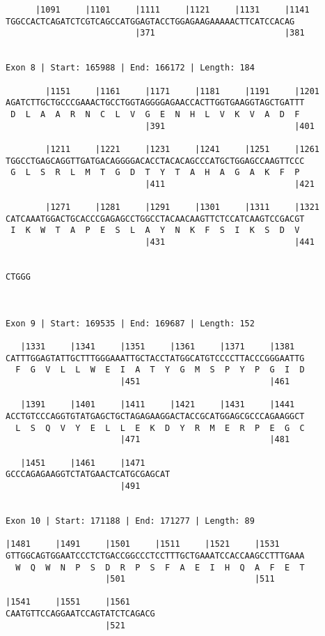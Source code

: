 \documentclass{article}
\begin{document}
\begin{Verbatim}
      |1091     |1101     |1111     |1121     |1131     |1141
TGGCCACTCAGATCTCGTCAGCCATGGAGTACCTGGAGAAGAAAAACTTCATCCACAG
                          |371                          |381
  
 
Exon 8 | Start: 165988 | End: 166172 | Length: 184
 
        |1151     |1161     |1171     |1181     |1191     |1201
AGATCTTGCTGCCCGAAACTGCCTGGTAGGGGAGAACCACTTGGTGAAGGTAGCTGATTT
 D  L  A  A  R  N  C  L  V  G  E  N  H  L  V  K  V  A  D  F 
                            |391                          |401
  
        |1211     |1221     |1231     |1241     |1251     |1261
TGGCCTGAGCAGGTTGATGACAGGGGACACCTACACAGCCCATGCTGGAGCCAAGTTCCC
 G  L  S  R  L  M  T  G  D  T  Y  T  A  H  A  G  A  K  F  P 
                            |411                          |421
  
        |1271     |1281     |1291     |1301     |1311     |1321
CATCAAATGGACTGCACCCGAGAGCCTGGCCTACAACAAGTTCTCCATCAAGTCCGACGT
 I  K  W  T  A  P  E  S  L  A  Y  N  K  F  S  I  K  S  D  V 
                            |431                          |441
  
     
CTGGG
     
  
 
Exon 9 | Start: 169535 | End: 169687 | Length: 152
 
   |1331     |1341     |1351     |1361     |1371     |1381  
CATTTGGAGTATTGCTTTGGGAAATTGCTACCTATGGCATGTCCCCTTACCCGGGAATTG
  F  G  V  L  L  W  E  I  A  T  Y  G  M  S  P  Y  P  G  I  D
                       |451                          |461   
  
   |1391     |1401     |1411     |1421     |1431     |1441  
ACCTGTCCCAGGTGTATGAGCTGCTAGAGAAGGACTACCGCATGGAGCGCCCAGAAGGCT
  L  S  Q  V  Y  E  L  L  E  K  D  Y  R  M  E  R  P  E  G  C
                       |471                          |481   
  
   |1451     |1461     |1471     
GCCCAGAGAAGGTCTATGAACTCATGCGAGCAT
                       |491      
  
 
Exon 10 | Start: 171188 | End: 171277 | Length: 89
 
|1481     |1491     |1501     |1511     |1521     |1531     
GTTGGCAGTGGAATCCCTCTGACCGGCCCTCCTTTGCTGAAATCCACCAAGCCTTTGAAA
  W  Q  W  N  P  S  D  R  P  S  F  A  E  I  H  Q  A  F  E  T
                    |501                          |511      
  
|1541     |1551     |1561     
CAATGTTCCAGGAATCCAGTATCTCAGACG
                    |521      
  

\end{Verbatim}
\end{document}
